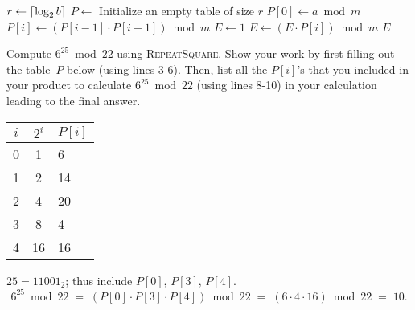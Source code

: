 \documentclass[11pt,addpoints,answers]{exam}
\begin{document}
\begin{questions}
\begin{parts}
    \begin{minipage}{\linewidth}
    \begin{algorithm}[H]
        \begin{algorithmic}[1]
            \State $r \gets \lceil\log_2 b\rceil$
            \State $P \gets $ Initialize an empty table of size $r$ 
            \State $P[0] \gets a \bmod m$
                \State $P[i] \gets (P[i-1] \cdot P[i-1]) \bmod m$
            \EndFor
            \State $E \gets 1$
                 
                    \State $E \gets (E \cdot P[i]) \bmod m$
                \EndIf
            \EndFor
            \State \Return $E$
        \EndFunction
        \end{algorithmic}
    \end{algorithm}
    \end{minipage}

    Compute $6^{25} \bmod 22$ using \textsc{RepeatSquare}. Show your work by first filling out the table~$P$ below (using lines 3-6). Then, list all the $P[i]$'s that you included in your product to calculate $6^{25} \bmod 22$ (using lines 8-10) in your calculation leading to the final answer. 
    
      \begin{table}[H]\centering
      \begin{tabular}{c|c|l}
      $i$ & $2^i$ & $P[i]$ \\
      \hline
        0 & 1  & 6  \\
        1 & 2  & 14 \\
        2 & 4  & 20 \\
        3 & 8  & 4  \\
        4 & 16 & 16 \\
      \end{tabular}
      \end{table}

      \begin{solution} 
      $25=11001_2$; thus include $P[0],\,P[3],\,P[4]$.
      \[
      6^{25}\bmod22 \;=\; (P[0]\cdot P[3]\cdot P[4]) \bmod 22
      \;=\;(6\cdot 4\cdot 16)\bmod22
      \;=\;10.
      \]
      \end{solution}
    

\end{parts}
\end{questions}
\end{document}
